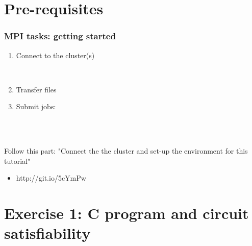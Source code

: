 \documentclass{beamer}
\begin{document}
\section{Pre-requisites}

\begin{frame}[fragile]
    \frametitle{MPI tasks: getting started}
    \begin{enumerate}
      \item Connect to the cluster(s)\\
        \begin{cmdline}
            \\
        \end{cmdline}

      \item Transfer files
        \begin{cmdline}
        \end{cmdline}

      \item  Submit jobs:
        \begin{cmdline}
            \\
            \\
        \end{cmdline}
	\end{enumerate}
	
    \begin{exampleblock}{Follow this part: "Connect the the cluster and set-up the environment for this tutorial"}
      \begin{itemize}
        \item http://git.io/5cYmPw
      \end{itemize}
    \end{exampleblock}	
	
\end{frame}





\section{Exercise 1: C program and circuit satisfiability}
\end{document}
